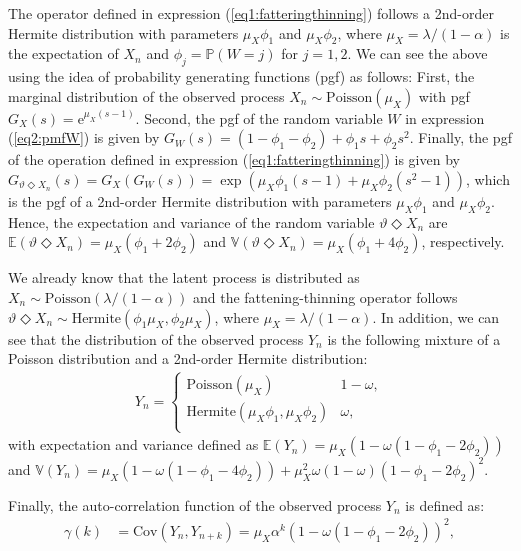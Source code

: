 \documentclass[Afour,sageh,times]{sagej}
\begin{document}
The operator defined in expression (\ref{eq1:fatteringthinning}) follows a 2nd-order Hermite distribution with parameters $\mu_X\phi_1$ and $\mu_X\phi_2$, where $\mu_X=\lambda/(1-\alpha)$ is the expectation of $X_n$ and $\phi_j=\mathbb{P}(W=j)$ for $j=1,2$. We can see the above using the idea of probability generating functions (pgf) as follows: First, the marginal distribution of the observed process $X_n \sim \textrm{Poisson}(\mu_X)$ with pgf $G_X(s)=\textrm{e}^{\mu_X(s-1)}$. Second, the pgf of the random variable $W$ in expression (\ref{eq2:pmfW}) is given by $G_W(s)=(1-\phi_1-\phi_2)+\phi_1s+\phi_2s^2$. Finally, the pgf of the operation defined in expression (\ref{eq1:fatteringthinning}) is given by $G_{\vartheta \Diamond X_n}(s)=G_X\left(G_W(s)\right)=\exp\left(\mu_X\phi_1(s-1)+\mu_X\phi_2(s^2-1)\right)$, which is the pgf of a 2nd-order Hermite distribution with parameters $\mu_X\phi_1$ and $\mu_X\phi_2$. Hence, the expectation and variance of the random variable $\vartheta \Diamond X_n$ are $\mathbb{E}\left(\vartheta \Diamond X_n\right)=\mu_X\left(\phi_1+2\phi_2\right)$ and $\mathbb{V}\left(\vartheta \Diamond X_n\right)=\mu_X\left(\phi_1+4\phi_2\right)$, respectively. 

We already know that the latent process is distributed as $X_n \sim \textrm{Poisson}(\lambda/(1-\alpha))$ and the fattening-thinning operator follows $\vartheta \Diamond X_n \sim \textrm{Hermite}(\phi_1\mu_X,\phi_2\mu_X)$, where $\mu_X=\lambda/(1-\alpha)$. In addition, we can see that the distribution of the observed process $Y_n$ is the following mixture of a Poisson distribution and a 2nd-order Hermite distribution:
\begin{align}\label{eq:mix}
Y_n=\begin{cases} 
\textrm{Poisson}(\mu_X) &  1-\omega, \\
\textrm{Hermite}\left(\mu_X\phi_1,\mu_X\phi_2\right) &  \omega, \\
\end{cases}
\end{align}
with expectation and variance defined as $\mathbb{E}(Y_n)=\mu_X(1-\omega(1-\phi_1-2\phi_2))$ and $\mathbb{V}(Y_n)=\mu_X(1-\omega (1-\phi_1-4\phi_2))+\mu_X^2\omega(1-\omega)(1-\phi_1-2\phi_2)^2$.

Finally, the auto-correlation function of the observed process $Y_n$ is defined as:  
\begin{align}
\gamma(k)&=\textrm{Cov}\left(Y_n,Y_{n+k}\right)=\mu_X\alpha^k\left(1-\omega\left(1-\phi_1-2\phi_2\right)\right)^2,
\end{align}
\end{document}
